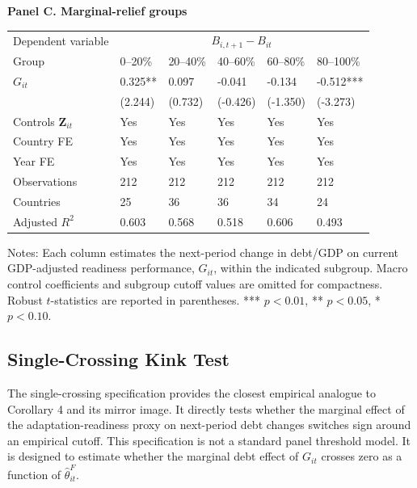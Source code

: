 \begin{table}[H]
\begin{threeparttable}
\vspace{0.75em}
\textbf{Panel C. Marginal-relief groups}\\[0.45em]
\begin{tabularx}{\textwidth}{lYYYYY}
\toprule
Dependent variable &  \\
\cmidrule(lr){2-6}
Group & 0--20\% & 20--40\% & 40--60\% & 60--80\% & 80--100\% \\
\midrule
$G_{it}$ & 0.325** & 0.097 & -0.041 & -0.134 & -0.512*** \\
 & (2.244) & (0.732) & (-0.426) & (-1.350) & (-3.273) \\
\midrule
Controls $\mathbf{Z}_{it}$ & Yes & Yes & Yes & Yes & Yes \\
Country FE & Yes & Yes & Yes & Yes & Yes \\
Year FE & Yes & Yes & Yes & Yes & Yes \\
Observations & 212 & 212 & 212 & 212 & 212 \\
Countries & 25 & 36 & 36 & 34 & 24 \\
Adjusted $R^2$ & 0.603 & 0.568 & 0.518 & 0.606 & 0.493 \\
\bottomrule
\end{tabularx}
\begin{tablenotes}[flushleft]\footnotesize
\item Notes: Each column estimates the next-period change in debt/GDP on current GDP-adjusted readiness performance, $G_{it}$, within the indicated subgroup. Macro control coefficients and subgroup cutoff values are omitted for compactness. Robust $t$-statistics are reported in parentheses. *** $p<0.01$, ** $p<0.05$, * $p<0.10$.
\end{tablenotes}
\end{threeparttable}
\end{table}

\subsection{Single-Crossing Kink Test}

The single-crossing specification provides the closest empirical analogue to Corollary 4 and its mirror image. It directly tests whether the marginal effect of the adaptation-readiness proxy on next-period debt changes switches sign around an empirical cutoff. This specification is not a standard panel threshold model. It is designed to estimate whether the marginal debt effect of $G_{it}$ crosses zero as a function of $\widehat\theta^F_{it}$.

